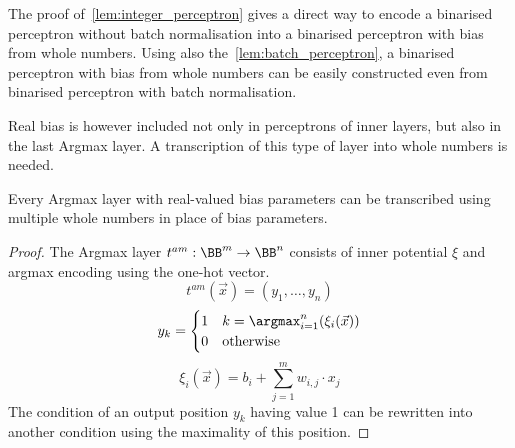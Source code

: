 \begin{remark}
    The proof of~\cref{lem:integer_perceptron} gives a direct way to encode a binarised
    perceptron without batch normalisation into a binarised perceptron with bias
    from whole numbers. Using also the~\cref{lem:batch_perceptron}, a binarised perceptron
    with bias from whole numbers can be easily constructed even from binarised perceptron
    with batch normalisation.
\end{remark}

Real bias is however included not only in perceptrons of inner layers,
but also in the last Argmax layer. A transcription of this type of layer
into whole numbers is needed.

\begin{lemma}\label{lem:integer_argmax}
    Every Argmax layer with real-valued bias parameters can be transcribed
    using multiple whole numbers in place of bias parameters.

    \begin{proof}
        The Argmax layer $t^{am}: \BB^m\to \BB^n$ consists of inner potential
        $\xi$ and argmax encoding using the one-hot vector.
        \[t^{am}(\vec x) = (y_1, \ldots, y_n)\]
        \[y_k = \begin{cases}
            1 & k = \argmax_{i=1}^n (\xi_i(\vec x))\\
            0 & \text{otherwise}
        \end{cases}\]
        \[ \xi_i(\vec x) = b_i + \sum_{j=1}^m w_{i, j} \cdot x_j \]
        The condition of an output position $y_k$ having value 1 can be rewritten
        into another condition using the maximality of this position.


\end{proof}
\end{lemma}
